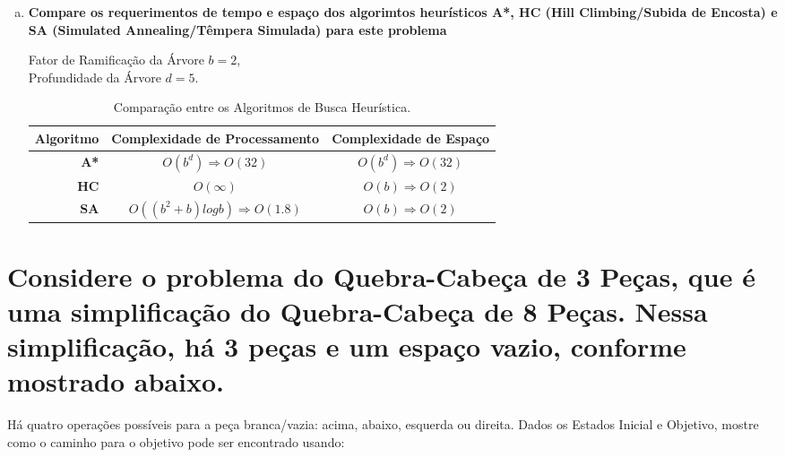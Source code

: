 \documentclass[paper=a4, fontsize=11pt]{scrartcl} %
\begin{document}
\begin{enumerate}[(a)]
        \item \textbf{Compare os requerimentos de tempo e espaço dos algorimtos heurísticos A*, HC (Hill Climbing/Subida de Encosta) e SA (Simulated Annealing/Têmpera Simulada) para este problema}
        \par Fator de Ramificação da Árvore $b= 2$,\\  Profundidade da Árvore $d = 5$.
        \par \begin{table}[h!]
            \begin{center}
              \caption{Comparação entre os Algoritmos de Busca Heurística.}
              \label{tab:table1}
              \begin{tabular}{r|c|c} %
                \textbf{Algoritmo} & \textbf{Complexidade de Processamento} & \textbf{Complexidade de Espaço}\\
                \hline
                \textbf{A*} & $O(b^d) \Rightarrow O(32)$ & $O(b^d) \Rightarrow O(32)$ \\
                \textbf{HC} & $O(\infty)$ & $O(b) \Rightarrow O(2)$ \\
                \textbf{SA} & $O((b^2 + b) log b) \Rightarrow O(1.8)$ & $O(b) \Rightarrow O(2)$\\
              \end{tabular}
            \end{center}
          \end{table}
        \vspace{0.2cm}


    \end{enumerate}

    
    \section{Considere o problema do Quebra-Cabeça de 3 Peças, que é uma simplificação do Quebra-Cabeça de 8 Peças. Nessa simplificação, há 3 peças e um espaço vazio, conforme mostrado abaixo. }
    

    \par{Há quatro operações possíveis para a peça branca/vazia: acima, abaixo, esquerda ou direita. Dados os Estados Inicial e Objetivo, mostre como o caminho para o objetivo pode ser encontrado usando:}
\end{document}
